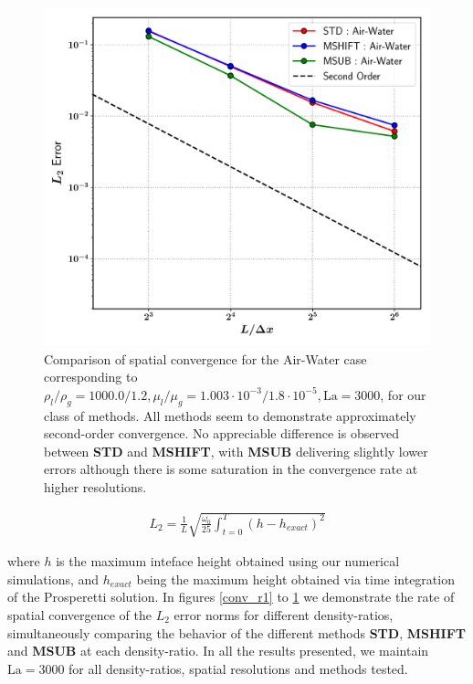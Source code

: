 \begin{figure}[h!]
    \centering
    \includegraphics[width = 1.0\textwidth]{plots/capwave/conv_aw.pdf}
	\caption{Comparison of spatial convergence for the Air-Water case corresponding to $\rho_l/\rho_g = 1000.0/1.2 , \mu_l/\mu_g = 1.003\cdot 10^{-3}/1.8\cdot 10^{-5} , \textrm{La} = 3000 $, for our class of methods. All methods seem to demonstrate approximately second-order convergence. No appreciable difference is observed between \textbf{STD} and \textbf{MSHIFT}, with \textbf{MSUB} delivering slightly lower errors although there is some saturation in the convergence rate at higher resolutions. }
    \label{conv_aw}
\end{figure}

\begin{align}
	L_2 = \frac{1}{L} \sqrt{\frac{\omega_0}{25} \int_{t=0}^{T} \left(h - h_{exact}\right)^2}
\end{align}

where $h$ is the maximum inteface height obtained using our numerical simulations, and $h_{exact}$ being the maximum height obtained via time integration of the Prosperetti solution. In figures \ref{conv_r1} to \ref{conv_aw} we demonstrate the rate of spatial convergence of the $L_2$ error norms for different density-ratios, simultaneously comparing the behavior of the different methods \textbf{STD}, \textbf{MSHIFT} and \textbf{MSUB} at each density-ratio. In all the results presented, we maintain $\textrm{La} = 3000$ for all density-ratios, spatial resolutions and methods tested.  

